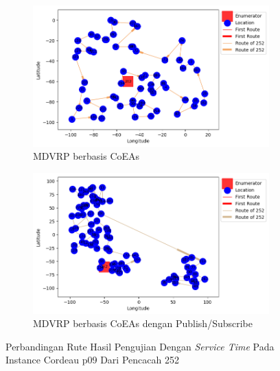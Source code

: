 \begin{figure}[H]
	\centering
	\begin{subfigure}[t]{\textwidth}
		\centering
		\includegraphics[width=\textwidth]{Resources/Images/cordeau_p09_tw/cordeau_p09_tw_252_coes}
		\caption{MDVRP berbasis CoEAs}
		\label{fig:cordeau_p09_tw_252_coes}
	\end{subfigure}
	\begin{subfigure}[t]{\textwidth}
		\centering
		\includegraphics[width=\textwidth]{Resources/Images/cordeau_p09_tw/cordeau_p09_tw_252_pubsub_coes}
		\caption{MDVRP berbasis CoEAs dengan Publish/Subscribe}
		\label{fig:cordeau_p09_tw_252_pubsub_coes}
	\end{subfigure}
	\caption{Perbandingan Rute Hasil Pengujian Dengan \textit{Service Time} Pada Instance Cordeau p09 Dari Pencacah 252}
	\label{fig:cordeau_p09_tw_252}
\end{figure}


